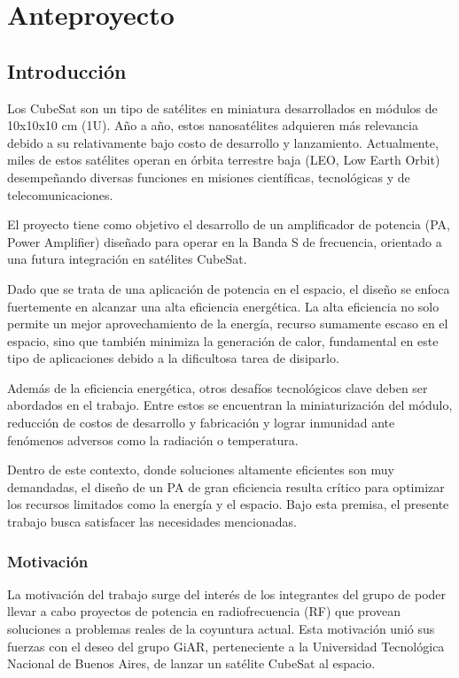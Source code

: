 \chapter[Anteproyecto]{Anteproyecto} \label{sec:anteproyecto}

\section{Introducción}
Los CubeSat son un tipo de satélites en miniatura desarrollados en módulos de 10x10x10 cm (1U). Año a año, estos nanosatélites adquieren más relevancia debido a su relativamente bajo costo de desarrollo y lanzamiento. Actualmente, miles de estos satélites operan en órbita terrestre baja (LEO, Low Earth Orbit) desempeñando diversas funciones en misiones científicas, tecnológicas y de telecomunicaciones.

El proyecto tiene como objetivo el desarrollo de un amplificador de potencia (PA, Power Amplifier) diseñado para operar en la Banda S de frecuencia, orientado a una futura integración en satélites CubeSat. 

Dado que se trata de una aplicación de potencia en el espacio, el diseño se enfoca fuertemente en alcanzar una alta eficiencia energética. La alta eficiencia no solo permite un mejor aprovechamiento de la energía, recurso sumamente escaso en el espacio, sino que también minimiza la generación de calor, fundamental en este tipo de aplicaciones debido a la dificultosa tarea de disiparlo.

Además de la eficiencia energética, otros desafíos tecnológicos clave deben ser abordados en el trabajo. Entre estos se encuentran la miniaturización del módulo, reducción de costos de desarrollo y fabricación y lograr inmunidad ante fenómenos adversos como la radiación o temperatura.

Dentro de este contexto, donde soluciones altamente eficientes son muy demandadas, el diseño de un PA de gran eficiencia resulta crítico para optimizar los recursos limitados como la energía y el espacio. Bajo esta premisa, el presente trabajo busca satisfacer las necesidades mencionadas.

\subsection{Motivación}
La motivación del trabajo surge del interés de los integrantes del grupo de poder llevar a cabo proyectos de potencia en radiofrecuencia (RF) que provean soluciones a problemas reales de la coyuntura actual. Esta motivación unió sus fuerzas con el deseo del grupo GiAR, perteneciente a la Universidad Tecnológica Nacional de Buenos Aires, de lanzar un satélite CubeSat al espacio.

